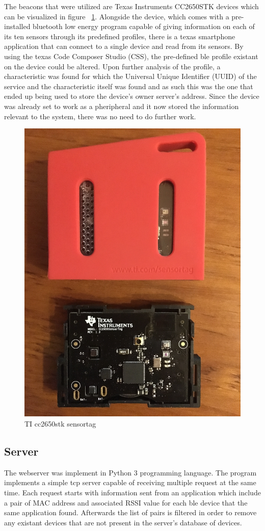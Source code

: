\documentclass[a4paper]{IEEEtran}
\begin{document}
The beacons that were utilized are Texas Instruments CC2650STK devices which can be visualized in figure ~\ref{fig:beacon}. Alongside the device, which comes with a pre-installed bluetooth low energy program capable of giving information on each of its ten sensors through its predefined profiles, there is a texas smartphone application that can connect to a single device and read from its sensors. By using the texas Code Composer Studio (CSS), the pre-defined ble profile existant on the device could be altered. Upon further analysis of the profile, a characteristic was found for which the Universal Unique Identifier (UUID) of the service and the characteristic itself was found and as such this was the one that ended up being used to store the device's owner server's address. Since the device was already set to work as a pheripheral and it now stored the information relevant to the system, there was no need to do further work.

\begin{figure}
	\centering
		\includegraphics[width=0.5\linewidth]{figures/beacon.jpg}
	\caption[TI cc2650stk sensortag]{TI cc2650stk sensortag}
	\label{fig:beacon}
\end{figure}


\subsection{ Server}
\label{subsec:server}

The webserver was implement in Python 3 programming language. The program implements a simple tcp server capable of receiving multiple request at the same time. Each request starts with information sent from an application which include a pair of MAC address and associated RSSI value for each ble device that the same application found. Afterwards the list of pairs is filtered in order to remove any existant devices that are not present in the server's database of devices.
\end{document}
